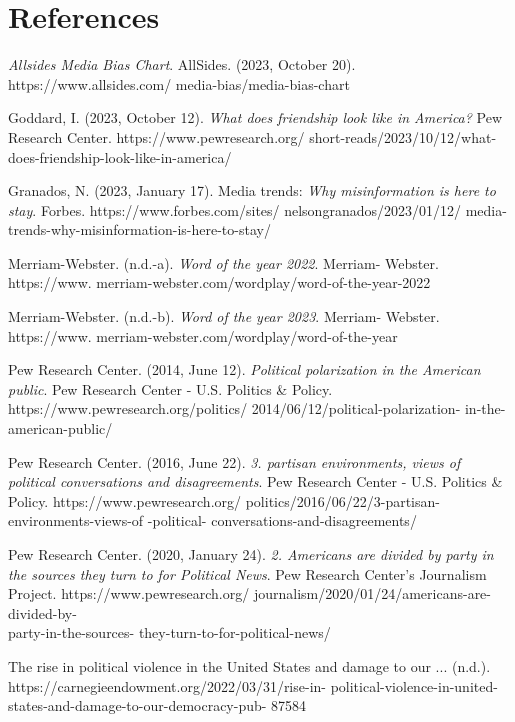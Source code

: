 \documentclass[titlepage, 12pt, leqno]{article}
\begin{document}
\section*{References}
\begin{enumerate}[label={[\arabic*]}]
    \item \textit{Allsides Media Bias Chart}. AllSides. (2023, October 20).
        https://www.allsides.com/ media-bias/media-bias-chart 
    \item Goddard, I. (2023, October 12). \textit{What does friendship look like 
        in America?} Pew Research Center. https://www.pewresearch.org/
        short-reads/2023/10/12/what-does-friendship-look-like-in-america/ 
    \item Granados, N. (2023, January 17). Media trends: \textit{Why 
        misinformation is here to stay}. Forbes. https://www.forbes.com/sites/
        nelsongranados/2023/01/12/
        media-trends-why-misinformation-is-here-to-stay/ 
    \item Merriam-Webster. (n.d.-a). \textit{Word of the year 2022}. Merriam-
        Webster. https://www. merriam-webster.com/wordplay/word-of-the-year-2022 
    \item Merriam-Webster. (n.d.-b). \textit{Word of the year 2023}. Merriam-
        Webster. https://www. merriam-webster.com/wordplay/word-of-the-year 
    \item Pew Research Center. (2014, June 12). \textit{Political polarization 
        in the American public}. Pew Research Center - U.S. Politics \& Policy.
        https://www.pewresearch.org/politics/ 2014/06/12/political-polarization-
        in-the-american-public/ 
    \item Pew Research Center. (2016, June 22). \textit{3. partisan 
        environments, views of political conversations and disagreements}. Pew 
        Research Center - U.S. Politics \& Policy. https://www.pewresearch.org/
        politics/2016/06/22/3-partisan-environments-views-of -political-
        conversations-and-disagreements/ 
    \item Pew Research Center. (2020, January 24). \textit{2. Americans are 
        divided by party in the sources they turn to for Political News}. Pew
        Research Center’s Journalism Project. https://www.pewresearch.org/
        journalism/2020/01/24/americans-are-divided-by-\\party-in-the-sources-
        they-turn-to-for-political-news/ 
    \item The rise in political violence in the United States and damage to
        our ... (n.d.). https://carnegieendowment.org/2022/03/31/rise-in-
        political-violence-in-united-\\states-and-damage-to-our-democracy-pub-
        87584 
\end{enumerate}
\end{document}
